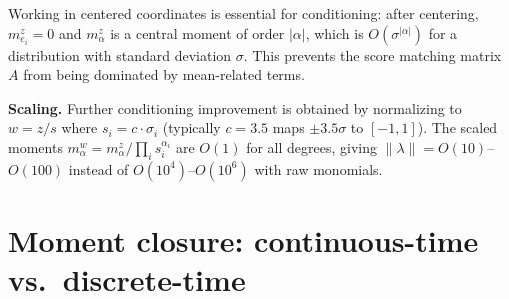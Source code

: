 \documentclass{article}
\theoremstyle{definition}
\begin{document}
Working in centered coordinates is essential for conditioning:
after centering, $m^z_{e_i} = 0$ and $m^z_\alpha$ is a central
moment of order $|\alpha|$, which is $O(\sigma^{|\alpha|})$
for a distribution with standard deviation $\sigma$.
This prevents the score matching matrix $A$ from being dominated
by mean-related terms.

\textbf{Scaling.} Further conditioning improvement is obtained by
normalizing to $w = z / s$ where $s_i = c \cdot \sigma_i$
(typically $c = 3.5$ maps $\pm 3.5\sigma$ to $[-1, 1]$).
The scaled moments $m^w_\alpha = m^z_\alpha / \prod_i s_i^{\alpha_i}$
are $O(1)$ for all degrees, giving $\|\lambda\| = O(10)$--$O(100)$
instead of $O(10^4)$--$O(10^6)$ with raw monomials.

\section{Moment closure: continuous-time vs.\ discrete-time}
\label{app:closure-comparison}
\end{document}
